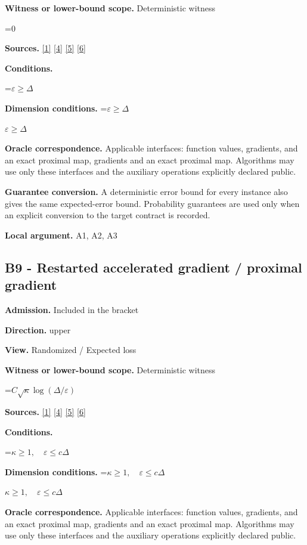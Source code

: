 \documentclass[10pt,a4paper]{article}
\newcommand{\AtlasMath}[1]{\par\begingroup\centering\setbox0=\hbox{$\displaystyle #1$}\ifdim\wd0>1.4\linewidth\typeout{ATLAS WIDE FORMULA: \the\wd0}\fi\ifdim\wd0>\linewidth\resizebox{\linewidth}{!}{\box0}\else\box0\fi\par\endgroup}
\newcommand{\AtlasInlineMath}[1]{\begingroup\setbox0=\hbox{$#1$}\ifdim\wd0>.4\linewidth\endgroup\AtlasMath{#1}\else\endgroup$#1$\fi}
\begin{document}
\textbf{Witness or lower-bound scope.} Deterministic witness

\AtlasMath{0}
\textbf{Sources.} \href{https://www.tau.ac.il/~becka/FISTA.pdf}{[1]} \href{https://arxiv.org/pdf/1405.4980}{[4]} \href{https://www2.isye.gatech.edu/~nemirovs/MOR_AccuracyCertificates.pdf}{[5]} \href{https://arxiv.org/pdf/2609.20701}{[6]}

\textbf{Conditions.} 
\AtlasMath{\varepsilon\ge\Delta}


\textbf{Dimension conditions.} \AtlasInlineMath{\varepsilon\ge\Delta}

\textbf{Oracle correspondence.} Applicable interfaces: function values, gradients, and an exact proximal map, gradients and an exact proximal map. Algorithms may use only these interfaces and the auxiliary operations explicitly declared public.

\textbf{Guarantee conversion.} A deterministic error bound for every instance also gives the same expected-error bound. Probability guarantees are used only when an explicit conversion to the target contract is recorded.

\textbf{Local argument.} A1, A2, A3

\subsection{B9 - Restarted accelerated gradient / proximal gradient}
\textbf{Admission.} Included in the bracket

\textbf{Direction.} upper

\textbf{View.} Randomized / Expected loss

\textbf{Witness or lower-bound scope.} Deterministic witness

\AtlasMath{C\sqrt\kappa\log(\Delta/\varepsilon)}
\textbf{Sources.} \href{https://www.tau.ac.il/~becka/FISTA.pdf}{[1]} \href{https://arxiv.org/pdf/1405.4980}{[4]} \href{https://www2.isye.gatech.edu/~nemirovs/MOR_AccuracyCertificates.pdf}{[5]} \href{https://arxiv.org/pdf/2609.20701}{[6]}

\textbf{Conditions.} 
\AtlasMath{\kappa\ge1,\quad\varepsilon\le c\Delta}


\textbf{Dimension conditions.} \AtlasInlineMath{\kappa\ge1,\quad\varepsilon\le c\Delta}

\textbf{Oracle correspondence.} Applicable interfaces: function values, gradients, and an exact proximal map, gradients and an exact proximal map. Algorithms may use only these interfaces and the auxiliary operations explicitly declared public.
\end{document}
